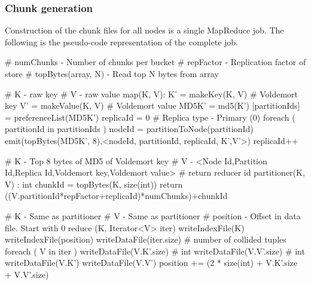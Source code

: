 \documentclass[10pt,twocolumn,preprint,natbib,authoryear]{sigplanconf}
\begin{document}

\subsubsection{Chunk generation}
\label{sec:read_only:chunk_generation}

Construction of the chunk files for all nodes is a single MapReduce job. The following is the pseudo-code representation of the complete job. 

\scriptsize
\label{MapReduce for Chunk generation}
\begin{verbatimtab}
# numChunks - Number of chunks per bucket
# repFactor - Replication factor of store
# topBytes(array, N) - Read top N bytes from array

# K - raw key
# V - raw value
map(K, V):
  K' = makeKey(K, V)     	# Voldemort key
  V' = makeValue(K, V)   	# Voldemort value
  MD5K' = md5(K')
  [partitionIds] = preferenceList(MD5K')
  replicaId = 0			# Replica type - Primary (0)
  foreach ( partitionId in partitionIds )
    nodeId = partitionToNode(partitionId)
    emit(topBytes(MD5K', 8),<nodeId, partitionId, replicaId, K',V'>) 
    replicaId++     

# K - Top 8 bytes of MD5 of Voldemort key
# V - <Node Id,Partition Id,Replica Id,Voldemort key,Voldemort value>
# return reducer id
partitioner(K, V) : int
  chunkId = topBytes(K, size(int)) %
  return ((V.partitionId*repFactor+replicaId)*numChunks)+chunkId
 
# K - Same as partitioner
# V - Same as partitioner
# position - Offset in data file. Start with 0
reduce (K, Iterator<V> iter)
  writeIndexFile(K)
  writeIndexFile(position)
  writeDataFile(iter.size)   # number of collided tuples
  foreach ( V in iter )
    writeDataFile(V.K'.size) # int
    writeDataFile(V.V'.size) # int
    writeDataFile(V.K')
    writeDataFile(V.V')
    position += (2 * size(int) + V.K'.size + V.V'.size)
\end{verbatimtab}
\normalsize
\end{document}
